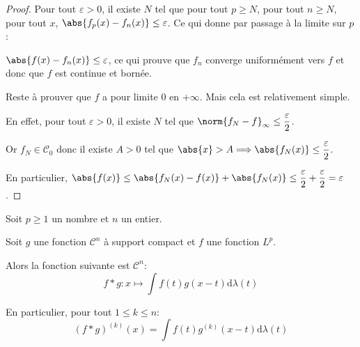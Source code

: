 \begin{proof}
Pour tout $\varepsilon > 0$, il existe $N$ tel que pour tout $p \geq N$, pour tout $n \geq N$, pour tout $x$, $\abs{f_p(x)-f_n(x)} \leq \varepsilon$. Ce qui donne par passage à la limite sur $p$: 

$\abs{f(x)-f_n(x)} \leq \varepsilon$, ce qui prouve que $f_n$ converge uniformément vers $f$ et donc que $f$ est continue et bornée.

Reste à prouver que $f$ a pour limite $0$ en $+\infty$. Mais cela est relativement simple.

En effet, pour tout $\varepsilon>0$, il existe $N$ tel que $\norm{f_N-f}_{\infty} \leq \dfrac{\varepsilon}{2}$.

Or $f_N \in \mathcal{C}_0$ donc il existe $A>0$ tel que $\abs{x} > A \Longrightarrow \abs{f_N(x)} \leq \dfrac{\varepsilon}{2}$. 

En particulier, $\abs{f(x)} \leq \abs{f_N(x)-f(x)} + \abs{f_N(x)} \leq \dfrac{\varepsilon}{2}+\dfrac{\varepsilon}{2}=\varepsilon$.
\end{proof}


\begin{de}
Soit $p \geq 1$ un nombre et $n$ un entier. 

Soit $g$ une fonction $\mathcal{C}^n$ à support compact et $f$ une fonction $L^p$.

Alors la fonction suivante est $\mathcal{C}^n$:
\[
f*g: x \mapsto \displaystyle{\int} f(t)g(x-t) \mathrm d \lambda(t)
\]

En particulier, pour tout $1 \leq k \leq n$:
\[
(f*g)^{(k)}(x) = \displaystyle{\int} f(t)g^{(k)}(x-t) \mathrm d \lambda(t)
\]
\end{de}

